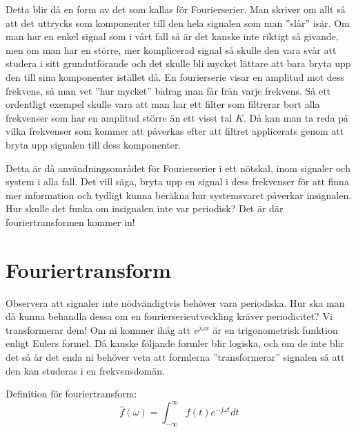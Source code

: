 \documentclass{article}
\begin{document}
Detta blir då en form av det som kallas för Fourierserier. Man skriver om allt så att det uttrycks som komponenter till den hela signalen som man ''slår'' isär. Om man har en enkel signal som i vårt fall så är det kanske inte riktigt så givande, men om man har en större, mer komplicerad signal så skulle den vara svår att studera i sitt grundutförande och det skulle bli mycket lättare att bara bryta upp den till sina komponenter istället då. \newline
En fourierserie visar en amplitud mot dess frekvens, så man vet ''hur mycket'' bidrag man får från varje frekvens. Så ett ordentligt exempel skulle vara att man har ett filter som filtrerar bort alla frekvenser som har en amplitud större än ett visst tal $K$. Då kan man ta reda på vilka frekvenser som kommer att påverkas efter att filtret applicerats genom att bryta upp signalen till dess komponenter. \newline

Detta är då användningsområdet för Fourierserier i ett nötskal, inom signaler och system i alla fall. Det vill säga, bryta upp en signal i dess frekvenser för att finna mer information och tydligt kunna beräkna hur systemsvaret påverkar insignalen. Hur skulle det funka om insignalen inte var periodisk? \newline
Det är där fouriertransformen kommer in!

\section{Fouriertransform}

Observera att signaler inte nödvändigtvis behöver vara periodiska. Hur ska man då kunna behandla dessa om en fourierserieutveckling kräver periodicitet? Vi transformerar dem! Om ni kommer ihåg att $e^{j\omega x}$ är en trigonometrisk funktion enligt Eulers formel. Då kanske följande formler blir logiska, och om de inte blir det så är det enda ni behöver veta att formlerna ''transformerar'' signalen så att den kan studeras i en frekvensdomän.

Definition för fouriertransform:
$$\hat{f}(\omega) = \int_{-\infty}^{\infty} f(t) e^{-j \omega t} dt$$
\end{document}
